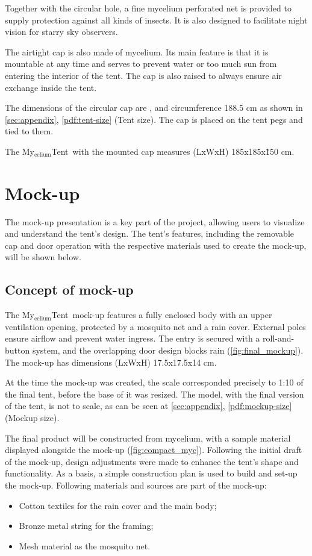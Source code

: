 \documentclass{article}
\newcommand{\myc}{My$_{\text{celium}}$Tent}
\begin{document}
Together with the circular hole, a fine mycelium perforated net is provided to supply
protection against all kinds of insects. It is also designed to facilitate night vision for starry
sky observers.

The airtight cap is also made of mycelium. Its main feature is that it is mountable at
any time and serves to prevent water or too much sun from entering the interior of the
tent. The cap is also raised to always ensure air exchange inside the tent.

The dimensions of the circular cap are \diameter 60cm, and circumference 188.5 cm
as shown in \autoref{sec:appendix}, \autoref{pdf:tent-size} (Tent size).
The cap is placed on the tent pegs and tied to them.

The \myc\ with the mounted cap measures (LxWxH) 185x185x\~150 cm.

\section{Mock-up}
The mock-up presentation is a key part of the project, allowing users to visualize and
understand the tent's design. The tent's features, including the removable cap and door
operation with the respective materials used to create the mock-up, will be shown below.

\subsection{Concept of mock-up}
The \myc\ mock-up features a fully enclosed body with an upper ventilation
opening, protected by a mosquito net and a rain cover.
External poles ensure airflow and prevent water ingress. The entry is secured with a
roll-and-button system, and the overlapping door design blocks rain (\autoref{fig:final_mockup}).
The mock-up has dimensions (LxWxH) 17.5x17.5x14 cm.

At the time the mock-up was created, the scale corresponded precisely to 1:10 of the final
tent, before the base of it was resized. The model, with the final version of the tent, is
not to scale, as can be seen at \autoref{sec:appendix}, \autoref{pdf:mockup-size} (Mockup size).

The final product will be constructed from mycelium, with a sample material displayed
alongside the mock-up (\autoref{fig:compact_myc}). Following the initial draft of the
mock-up, design adjustments were made to enhance the tent's shape and functionality. As a
basis, a simple construction plan is used to build and set-up the mock-up. Following
materials and sources are part of the mock-up:
\begin{itemize}
    \item Cotton textiles for the rain cover and the main body;
    \item Bronze metal string for the framing;
    \item Mesh material as the mosquito net.
\end{itemize}
\end{document}

